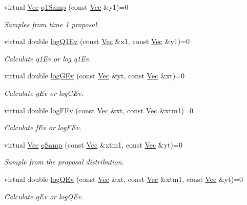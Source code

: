 \begin{DoxyCompactItemize}
virtual \hyperlink{apf__filter_8h_a4c7df05c6f5e8a0d15ae14bcdbc07152}{Vec} \hyperlink{classSISRFilter_a224499663b0412e7ab635828b260aca5}{q1\+Samp} (const \hyperlink{apf__filter_8h_a4c7df05c6f5e8a0d15ae14bcdbc07152}{Vec} \&y1)=0
\begin{DoxyCompactList}\small\item\em Samples from time 1 proposal. \end{DoxyCompactList}\item 
virtual double \hyperlink{classSISRFilter_a156fcb8c2250e7c480c452d2937b1317}{log\+Q1\+Ev} (const \hyperlink{apf__filter_8h_a4c7df05c6f5e8a0d15ae14bcdbc07152}{Vec} \&x1, const \hyperlink{apf__filter_8h_a4c7df05c6f5e8a0d15ae14bcdbc07152}{Vec} \&y1)=0
\begin{DoxyCompactList}\small\item\em Calculate q1\+Ev or log q1\+Ev. \end{DoxyCompactList}\item 
virtual double \hyperlink{classSISRFilter_abd4a1a22f548e1ce70353ea1d9fa0c1d}{log\+G\+Ev} (const \hyperlink{apf__filter_8h_a4c7df05c6f5e8a0d15ae14bcdbc07152}{Vec} \&yt, const \hyperlink{apf__filter_8h_a4c7df05c6f5e8a0d15ae14bcdbc07152}{Vec} \&xt)=0
\begin{DoxyCompactList}\small\item\em Calculate g\+Ev or log\+G\+Ev. \end{DoxyCompactList}\item 
virtual double \hyperlink{classSISRFilter_a49cf666cefd3f0dd3c85c445dd4cebb1}{log\+F\+Ev} (const \hyperlink{apf__filter_8h_a4c7df05c6f5e8a0d15ae14bcdbc07152}{Vec} \&xt, const \hyperlink{apf__filter_8h_a4c7df05c6f5e8a0d15ae14bcdbc07152}{Vec} \&xtm1)=0
\begin{DoxyCompactList}\small\item\em Calculate f\+Ev or log\+F\+Ev. \end{DoxyCompactList}\item 
virtual \hyperlink{apf__filter_8h_a4c7df05c6f5e8a0d15ae14bcdbc07152}{Vec} \hyperlink{classSISRFilter_aa88835b857c73628e4cd013b299a3746}{q\+Samp} (const \hyperlink{apf__filter_8h_a4c7df05c6f5e8a0d15ae14bcdbc07152}{Vec} \&xtm1, const \hyperlink{apf__filter_8h_a4c7df05c6f5e8a0d15ae14bcdbc07152}{Vec} \&yt)=0
\begin{DoxyCompactList}\small\item\em Sample from the proposal distribution. \end{DoxyCompactList}\item 
virtual double \hyperlink{classSISRFilter_ac489579a2d5b603bbd184357a6068142}{log\+Q\+Ev} (const \hyperlink{apf__filter_8h_a4c7df05c6f5e8a0d15ae14bcdbc07152}{Vec} \&xt, const \hyperlink{apf__filter_8h_a4c7df05c6f5e8a0d15ae14bcdbc07152}{Vec} \&xtm1, const \hyperlink{apf__filter_8h_a4c7df05c6f5e8a0d15ae14bcdbc07152}{Vec} \&yt)=0
\begin{DoxyCompactList}\small\item\em Calculate q\+Ev or log\+Q\+Ev. \end{DoxyCompactList}\end{DoxyCompactItemize}


